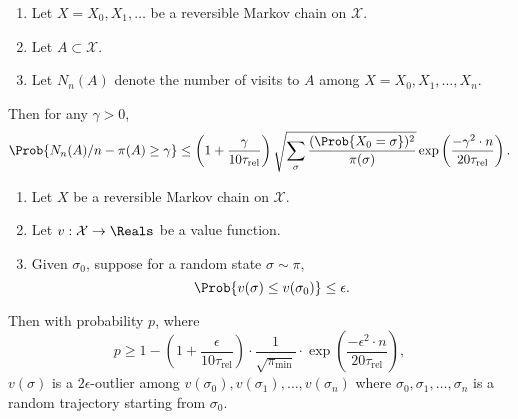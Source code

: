 \documentclass[12pt]{article}
\begin{document}
\begin{theorem}
    \label{thm:serialsignificance:gillman}
    \begin{enumerate}
        \item
            Let \( X = X_0, X_1, \dots \) be a reversible Markov chain
            on \( \mathcal{X} \).
        \item
            Let \( A \subset \mathcal{X} \).
        \item
            Let \( N_n(A) \) denote the number of visits to \( A \)
            among \( X = X_0, X_1, \dots, X_n \).
    \end{enumerate}
    Then for any \( \gamma > 0 \),
    \[
        \Prob{N_n(A)/n - \pi(A) \ge \gamma} \le \left( 1 + \frac{\gamma}
        {10 \tau_{\text{rel}}} \right) \sqrt{\sum_{\sigma} \frac{(\Prob{X_0
        = \sigma})^2}{\pi (\sigma)}} \exp \left( \frac{-\gamma^2 \cdot n}
        {20 \tau_{\text{rel}}} \right).
    \]
\end{theorem}

\begin{theorem}
    \label{thm:serialsignificance:powerthm}
    \begin{enumerate}
        \item
            Let \( X \) be a reversible Markov chain on \( \mathcal{X} \).
        \item
            Let \( v :  \mathcal{X} \to \Reals \) be a value function.
        \item
            Given \( \sigma_0 \), suppose for a random state \( \sigma
            \sim \pi \),
            \[
                \Prob{v(\sigma) \le v(\sigma_0)} \le \epsilon.
            \]
    \end{enumerate}
    Then with probability \( p \), where
    \[
        p \ge 1 - \left( 1 + \frac{\epsilon}{10 \tau_{\text{rel}}}
        \right) \cdot \frac{1}{\sqrt{\pi_{\min}}} \cdot \exp \left(
        \frac {-\epsilon^ {2} \cdot n}{20 \tau_{\text{rel}}} \right),
    \] \( v(\sigma) \) is a \( 2\epsilon \)-outlier among \( v(\sigma_0),
    v(\sigma_1), \dots, v(\sigma_n) \) where \( \sigma_0, \sigma_1,
    \dots, \sigma_n \) is a random trajectory starting from \( \sigma_0 \).
\end{theorem}
\end{document}
